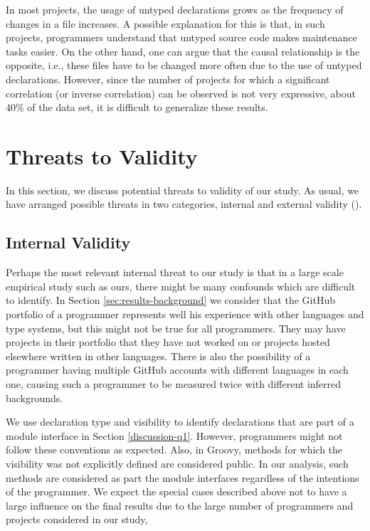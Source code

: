\documentclass[msc]{ppgccufmg}
\begin{document}
In most projects, the usage of untyped declarations grows as the frequency of changes in a file increases.
A possible explanation for this is that, in such projects, programmers understand that untyped source code makes maintenance tasks easier.
On the other hand, one can argue that the causal relationship is the opposite, i.e., these files have to be changed more often due to the use of untyped declarations.
However, since the number of projects for which a significant correlation (or inverse correlation) can be observed is not very expressive, about 40\% of the data set, it is difficult to generalize these results.


\section{Threats to Validity\label{threats}}
In this section, we discuss potential threats to validity of our study. As usual, we have arranged possible threats in two categories, internal and external validity (\cite{Wohlin2012}). 

\subsection*{Internal Validity}
Perhaps the most relevant internal threat to our study is that in a large scale empirical study such as ours, there might be many confounds which are difficult to identify.
In Section \ref{sec:results-background} we consider that the GitHub portfolio of a programmer represents well his experience with other languages and type systems, but this might not be true for all programmers.
They may have projects in their portfolio that they have not worked on or projects hosted elsewhere written in other languages.
There is also the possibility of a programmer having multiple GitHub accounts with different languages in each one, causing such a programmer to be measured twice with different inferred backgrounds.


We use declaration type and visibility to identify declarations that are part of a module interface in Section \ref{discussion-q1}. 
However, programmers might not follow these conventions as expected.
Also, in Groovy, methods for which the visibility was not explicitly defined are considered public.
In our analysis, such methods are considered as part the module interfaces regardless of the intentions of the programmer.
We expect the special cases described above not to have a large influence on the final results due to the large number of programmers and projects considered in our study, 
\end{document}
